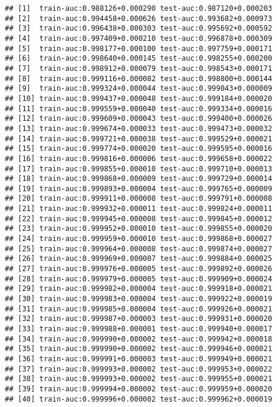 \documentclass[11pt,]{article}
\begin{document}
\begin{verbatim}
## [1]  train-auc:0.988126+0.000290 test-auc:0.987120+0.000203 
## [2]  train-auc:0.994458+0.000626 test-auc:0.993682+0.000973 
## [3]  train-auc:0.996438+0.000303 test-auc:0.995692+0.000592 
## [4]  train-auc:0.997409+0.000210 test-auc:0.996878+0.000309 
## [5]  train-auc:0.998177+0.000100 test-auc:0.997759+0.000171 
## [6]  train-auc:0.998640+0.000145 test-auc:0.998255+0.000200 
## [7]  train-auc:0.998912+0.000079 test-auc:0.998543+0.000171 
## [8]  train-auc:0.999116+0.000082 test-auc:0.998800+0.000144 
## [9]  train-auc:0.999324+0.000044 test-auc:0.999043+0.000009 
## [10] train-auc:0.999437+0.000048 test-auc:0.999184+0.000020 
## [11] train-auc:0.999559+0.000040 test-auc:0.999334+0.000016 
## [12] train-auc:0.999609+0.000043 test-auc:0.999400+0.000026 
## [13] train-auc:0.999674+0.000033 test-auc:0.999473+0.000032 
## [14] train-auc:0.999721+0.000038 test-auc:0.999529+0.000021 
## [15] train-auc:0.999774+0.000020 test-auc:0.999595+0.000016 
## [16] train-auc:0.999816+0.000006 test-auc:0.999658+0.000022 
## [17] train-auc:0.999855+0.000010 test-auc:0.999710+0.000013 
## [18] train-auc:0.999868+0.000009 test-auc:0.999729+0.000014 
## [19] train-auc:0.999893+0.000004 test-auc:0.999765+0.000009 
## [20] train-auc:0.999911+0.000008 test-auc:0.999791+0.000008 
## [21] train-auc:0.999932+0.000011 test-auc:0.999824+0.000011 
## [22] train-auc:0.999945+0.000008 test-auc:0.999845+0.000012 
## [23] train-auc:0.999952+0.000010 test-auc:0.999855+0.000020 
## [24] train-auc:0.999959+0.000010 test-auc:0.999868+0.000027 
## [25] train-auc:0.999964+0.000008 test-auc:0.999874+0.000027 
## [26] train-auc:0.999969+0.000007 test-auc:0.999884+0.000025 
## [27] train-auc:0.999976+0.000005 test-auc:0.999892+0.000026 
## [28] train-auc:0.999979+0.000005 test-auc:0.999909+0.000024 
## [29] train-auc:0.999982+0.000004 test-auc:0.999918+0.000021 
## [30] train-auc:0.999983+0.000004 test-auc:0.999922+0.000019 
## [31] train-auc:0.999985+0.000004 test-auc:0.999926+0.000021 
## [32] train-auc:0.999987+0.000003 test-auc:0.999931+0.000020 
## [33] train-auc:0.999988+0.000001 test-auc:0.999940+0.000017 
## [34] train-auc:0.999990+0.000002 test-auc:0.999942+0.000018 
## [35] train-auc:0.999990+0.000002 test-auc:0.999946+0.000021 
## [36] train-auc:0.999991+0.000003 test-auc:0.999949+0.000021 
## [37] train-auc:0.999993+0.000002 test-auc:0.999953+0.000022 
## [38] train-auc:0.999993+0.000002 test-auc:0.999955+0.000021 
## [39] train-auc:0.999994+0.000002 test-auc:0.999959+0.000020 
## [40] train-auc:0.999996+0.000002 test-auc:0.999962+0.000019 

\end{verbatim}
\end{document}
